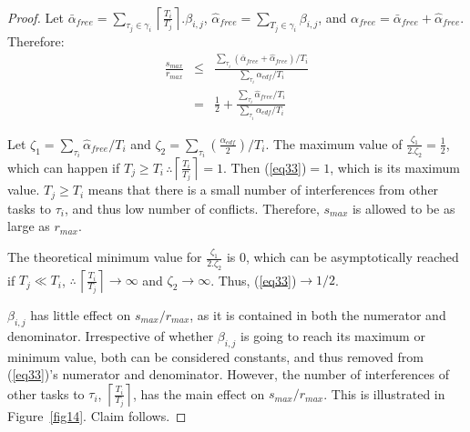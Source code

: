\documentclass[12pt,english]{report}
\newtheorem{proof}{Proof}
\begin{document}
\begin{proof}
Let $\bar{\alpha}_{free}=\sum_{\tau_{j}\in\gamma_{i}}\left\lceil\frac{T_{i}}{T_{j}}\right\rceil.\beta_{i,j}$,  $\hat{\alpha}_{free}=\sum_{T_{j}\in\gamma_{i}}\beta_{i,j}$, and $\alpha_{free}=\bar{\alpha}_{free}+\hat{\alpha}_{free}.$ Therefore: 
\begin{eqnarray}
\frac{s_{max}}{r_{max}} & \le & \frac{\sum_{\tau_{i}}(\bar{\alpha}_{free} +\hat{\alpha}_{free})/T_{i}}{\sum_{\tau_{i}}\alpha_{edf}/T_{i}}\nonumber \\
 & = & \frac{1}{2}+\frac{\sum_{\tau_{i}}\hat{\alpha}_{free} /T_{i}}{\sum_{\tau_{i}}\alpha_{edf}/T_{i}}
 \label{eq33}
 \end{eqnarray}

Let $\zeta_{1}=\sum_{\tau_{i}}\hat{\alpha}_{free}/T_{i}$
and $\zeta_{2}=\sum_{\tau_{i}}\left(\frac{\alpha_{edf}}{2}\right)/T_{i}$. The maximum value of $\frac{\zeta_{1}}{2.\zeta_{2}}=\frac{1}{2}$, which can happen if $T_{j}\ge T_{i}\,\therefore\left\lceil\frac{T_{i}}{T_{j}}\right\rceil=1$. Then (\ref{eq33})$=1$, which is its maximum value. $T_{j}\ge T_{i}$ means that there is a small number of interferences from other tasks
to $\tau_{i}$, and thus low number of conflicts. Therefore, $s_{max}$ is
allowed to be as large as $r_{max}$.

The theoretical minimum value for $\frac{\zeta_{1}}{2.\zeta_{2}}$
is $0$, which can be asymptotically reached if $T_{j}\ll T_{i}$,
$\therefore\,\left\lceil\frac{T_{i}}{T_{j}}\right\rceil\rightarrow\infty$
and $\zeta_{2}\rightarrow\infty$. Thus, (\ref{eq33})$\rightarrow1/2$.

$\beta_{i,j}$ has little effect on $s_{max}/r_{max}$, 
as it is contained in both the numerator and denominator. Irrespective of whether $\beta_{i,j}$ is going to reach its maximum or minimum value, both can be considered constants, and thus removed from (\ref{eq33})'s numerator and denominator. 
However, the number of
interferences of other tasks to $\tau_{i}$, $\left\lceil\frac{T_{i}}{T_{j}}\right\rceil$,
has the main effect on $s_{max}/r_{max}$. This is illustrated in Figure~\ref{fig14}. Claim follows.
\end{proof}
\end{document}
